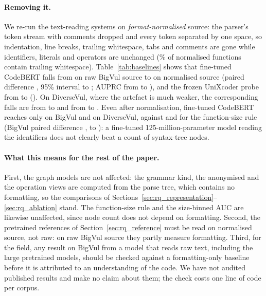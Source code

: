 \paragraph{Removing it.} We re-run the text-reading systems on
\emph{format-normalised} source: the parser's token stream with comments
dropped and every token separated by one space, so indentation, line breaks,
trailing whitespace, tabs and comments are gone while identifiers, literals and
operators are unchanged (\numartBvTrailNormAny\% of normalised functions contain
trailing whitespace). Table~\ref{tab:baselines} shows that fine-tuned CodeBERT
falls from \rBvLinevulAuc{} on raw BigVul source to \rBvLinevulNormAuc{} on
normalised source (paired difference \xBvLinevulVLinevulNormD{}, 95\% interval
\xBvLinevulVLinevulNormLo{} to \xBvLinevulVLinevulNormHi{}; AUPRC from
\rBvLinevulAuprc{} to \rBvLinevulNormAuprc{}), and the frozen UniXcoder probe from
\rBvUnixAuc{} to \rBvUnixNormAuc{} (\xBvUnixVUnixNormD{}). On DiverseVul, where the
artefact is much weaker, the corresponding falls are from \rDvLinevulAuc{} to
\rDvLinevulNormAuc{} and from \rDvUnixAuc{} to \rDvUnixNormAuc{}. Even after
normalisation, fine-tuned CodeBERT reaches only \rBvLinevulNormAuc{} on BigVul
and \rDvLinevulNormAuc{} on DiverseVul, against \numbvSizeAuc{} and
\numdvSizeAuc{} for the function-size rule (BigVul paired difference
\xBvLinevulNormVSizeD{}, \xBvLinevulNormVSizeLo{} to \xBvLinevulNormVSizeHi{}): a
fine-tuned 125-million-parameter model reading the identifiers does not clearly
beat a count of syntax-tree nodes.

\paragraph{What this means for the rest of the paper.} First, the graph models
are not affected: the grammar kind, the anonymised and the operation views are
computed from the parse tree, which contains no formatting, so the comparisons of
Sections~\ref{sec:rq_representation}--\ref{sec:rq_ablation} stand. The
function-size rule and the size-binned AUC are likewise unaffected, since node
count does not depend on formatting. Second, the pretrained references of
Section~\ref{sec:rq_reference} must be read on normalised source, not raw: on
raw BigVul source they partly measure formatting. Third, for the field, any
result on BigVul from a model that reads raw text, including the large
pretrained models, should be checked against a formatting-only baseline before it
is attributed to an understanding of the code. We have not audited published
results and make no claim about them; the check costs one line of code per
corpus.
